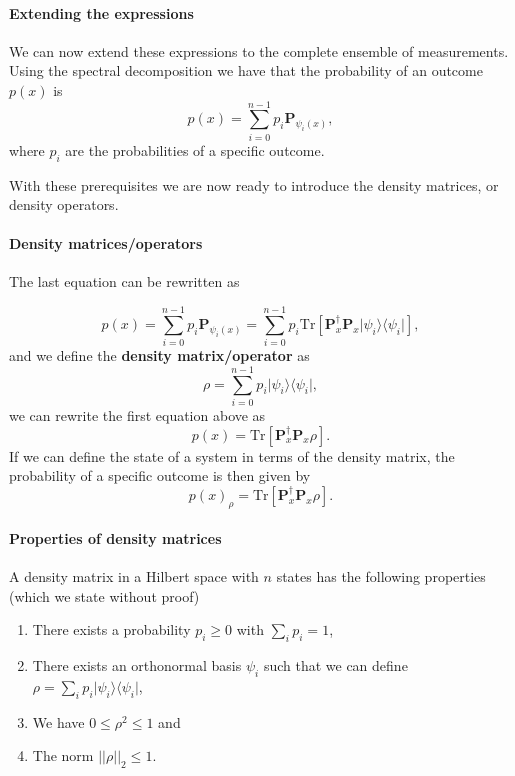 \paragraph{Extending the expressions}

We can now extend these expressions to the complete ensemble of measurements. Using the spectral decomposition we have that the probability of an outcome $p(x)$ is
\[
p(x)=\sum_{i=0}^{n-1}p_i\bm{P}_{\psi_i(x)},
\]
where $p_i$ are the probabilities of a specific outcome. 

With these prerequisites we are now ready to introduce the density  matrices, or density operators.


\paragraph{Density matrices/operators}

The last equation can be rewritten as 

\[
p(x)=\sum_{i=0}^{n-1}p_i\bm{P}_{\psi_i(x)}=\sum_{i=0}^{n-1}p_i\mathrm{Tr}\left[\bm{P}_x^{\dagger}\bm{P}_x\vert \psi_i\rangle\langle \psi_i\vert\right],
\]
and we define the \textbf{density matrix/operator} as
\[
\rho=\sum_{i=0}^{n-1}p_i\vert \psi_i\rangle\langle \psi_i\vert,
\]
we can rewrite the first equation above as 
\[
p(x)=\mathrm{Tr}\left[\bm{P}_x^{\dagger}\bm{P}_x\rho\right].
\]
If we can define the state of a system in terms of the density matrix, the probability of a specific outcome is then given by
\[
p(x)_{\rho}=\mathrm{Tr}\left[\bm{P}_x^{\dagger}\bm{P}_x\rho\right].
\]


\paragraph{Properties of density matrices}

A density matrix in a Hilbert space with $n$ states has the following properties (which we state without proof)
\begin{enumerate}
\item There exists a probability $p_i\geq 0$ with $\sum_ip_i=1$,

\item There exists an orthonormal basis $\psi_i$ such that we can define $\rho=\sum_ip_i\vert\psi_i\rangle\langle \psi_i\vert$,

\item We have $0 \leq \rho^2\leq 1$ and

\item The norm $\vert\vert \rho \vert\vert_2\leq 1$.
\end{enumerate}


